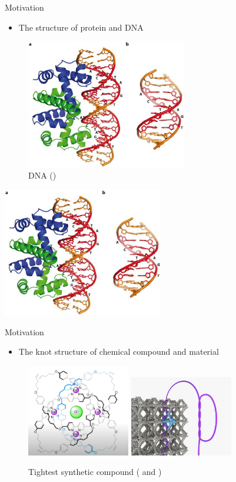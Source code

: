 \documentclass[]{beamer}
\begin{document}
\begin{frame}{Motivation}
\begin{itemize}
    \item The structure of protein and DNA
\end{itemize}
\begin{figure}
    \centering
\includegraphics[width=7cm]{Pictures/DNA.png}
    \caption{DNA (\cite{DNA})}
    \label{fig:enter-label}
\end{figure}
\centering
\includegraphics[width=7cm]{Pictures/DNA.png}
\end{frame}

\begin{frame}{Motivation}
\begin{itemize}
    \item The knot structure of chemical compound and material
\end{itemize}
\begin{figure}
    \centering
\includegraphics[width = 4.5cm]{Pictures/chemical.png}
\includegraphics[width=4.5cm]{Pictures/material.jpg}
    \caption{Tightest synthetic compound (\cite{compound} and \cite{farbric})}
    \label{fig:enter-label}
\end{figure}

\end{frame}
\end{document}
